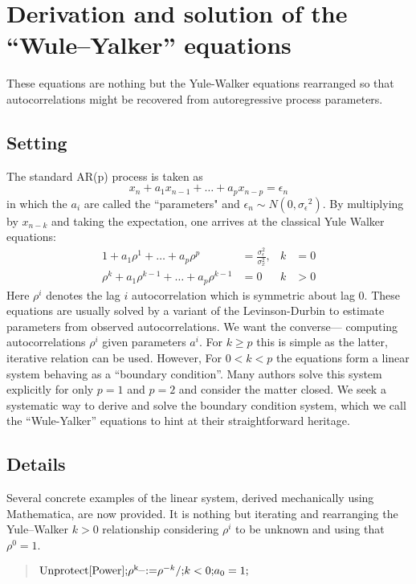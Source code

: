 \documentclass[12pt,letterpaper]{article}
\begin{document}
\section*{Derivation and solution of the ``Wule--Yalker'' equations}

These equations are nothing but the Yule-Walker equations rearranged so that
autocorrelations might be recovered from autoregressive process parameters.

\subsection*{Setting}

The standard AR(p) process is taken as
\[
x_n+a_1x_{n-1}+\dots+a_px_{n-p}=\epsilon _n
\]
in which the \(a_i\) are called the ``parameters" and \(\epsilon _n\sim
N\left(0,\sigma _{\epsilon }{}^2\right)\). By multiplying by \(x_{n-k}\) and
taking the expectation, one arrives at the classical Yule Walker equations:
\begin{align*}
1+a_1\rho ^1+\dots+a_p\rho ^p &= \frac{\sigma_{\epsilon}^2}{\sigma_x^2},
&
k&=0
\\
\rho ^k+a_1\rho ^{k-1}+\dots+a_p\rho ^{k-1}&=0
&
k &> 0
\end{align*}
Here $\rho^i$ denotes the lag $i$ autocorrelation which is symmetric about lag
$0$. These equations are usually solved by a variant of the Levinson-Durbin to
estimate parameters from observed autocorrelations. We want the converse---
computing autocorrelations $\rho^i$ given parameters $a^i$.  For $k\geq p$ this
is simple as the latter, iterative relation can be used. However, For $0<k<p$
the equations form a linear system behaving as a ``boundary condition''.  Many
authors solve this system explicitly for only $p=1$ and $p=2$ and consider the
matter closed.  We seek a systematic way to derive and solve the boundary
condition system, which we call the ``Wule-Yalker'' equations to hint at their
straightforward heritage.

\subsection*{Details}

Several concrete examples of the linear system, derived mechanically using
Mathematica, are now provided. It is nothing but iterating and rearranging the
Yule--Walker $k>0$ relationship considering $\rho ^i$ to be unknown and using
that $\rho^0=1$.

\begin{quote}
\noindent\({\text{Unprotect}[\text{Power}];}\\
{\rho ^{\text{k$\_$}}\text{:=}\rho ^{-k}\text{/;}k<0;}\\
{a_0=1;}\)
\end{quote}
\end{document}
